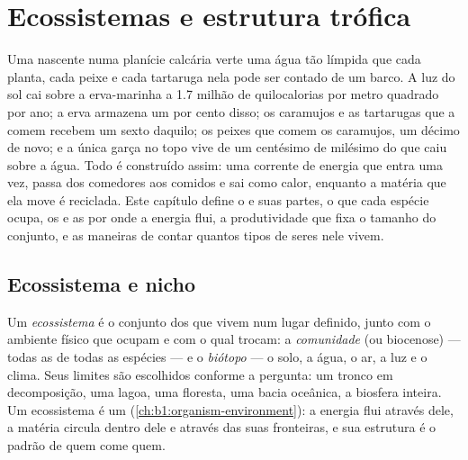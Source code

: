 \chapter{Ecossistemas e estrutura trófica}\label{ch:b1:ecosystem-organization}

Uma nascente numa planície calcária verte uma água tão límpida que
cada planta, cada peixe e cada tartaruga nela pode ser contado de um
barco. A luz do sol cai sobre a erva-marinha a \qty{1.7}{} milhão de
quilocalorias por metro quadrado por ano; a erva armazena um por cento
disso; os caramujos e as tartarugas que a comem recebem um sexto
daquilo; os peixes que comem os caramujos, um décimo de novo; e a
única garça no topo vive de um centésimo de milésimo do que caiu sobre
a água. Todo  é construído assim: uma corrente de energia
que entra uma vez, passa dos comedores aos comidos e sai como calor,
enquanto a matéria que ela move é reciclada. Este capítulo define o
 e suas partes, o  que cada espécie ocupa, os  e as  por onde a energia flui, a
produtividade que fixa o tamanho do conjunto, e as maneiras de contar
quantos tipos de seres nele vivem.

\section{Ecossistema e nicho}

\begin{definition}\label{def:b1:ecosystem-organization:ecosystem}
Um \emph{ecossistema} é o conjunto dos  que vivem num lugar
definido, junto com o ambiente físico que ocupam e com o qual trocam:
a \emph{comunidade} (ou biocenose) --- todas as  de todas as
espécies --- e o \emph{biótopo} --- o solo, a água, o ar, a luz e o
clima. Seus limites são escolhidos conforme a pergunta: um tronco em
decomposição, uma lagoa, uma floresta, uma bacia oceânica, a biosfera
inteira. Um ecossistema é um 
(\cref{ch:b1:organism-environment}): a energia flui através dele, a
matéria circula dentro dele e através das suas fronteiras, e sua
estrutura é o padrão de quem come quem.
\end{definition}

